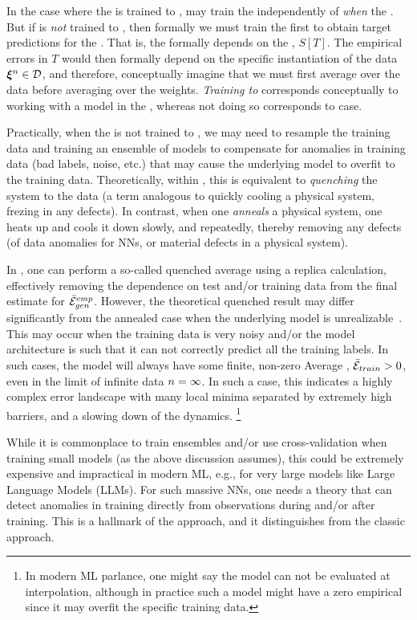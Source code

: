 In the case where the \Teacher is trained to \Interpolation, may train the \Student 
independently of \emph{when} the \Teacher.  
But if \Teacher is \emph{not} trained to \Interpolation, then formally we must train the \Teacher
first to obtain target predictions for the \Student.  That is, the \Student formally
depends on the \Teacher, $S[T]$.
The empirical errors in $T$ would then formally depend on the specific instantiation of the data  $\boldsymbol{\xi}^{n}\in\mathcal{D}$,
and therefore, conceptually imagine that we must first average over the data
before averaging over the weights.
\emph{Training to \Interpolation} corresponds conceptually to working with a model
in the \AnnealedApproximation, whereas not doing so corresponds to \Quenched case.

Practically, when the \Teacher is not trained to \Interpolation, 
we may need to resample the training data and training an ensemble of models to compensate for anomalies in training data (bad labels, noise, etc.) that may cause the underlying model to overfit to the training data.
Theoretically, within \SMOG, this is equivalent to \emph{quenching} the system to the data (a term analogous to quickly cooling a physical system, frezing in any defects).
In contrast, when one \emph{anneals} a physical system, one heats up and cools it down slowly, and repeatedly, thereby removing any defects (of data anomalies for NNs, or material defects in a physical system).

In \STATMECH, one can perform a so-called quenched average using a replica calculation,
effectively removing the dependence on test and/or training data
from the final estimate for $\bar{\mathcal{E}}^{emp}_{gen}$.
However, the theoretical quenched result may differ significantly from the annealed case when the underlying model is unrealizable~\cite{SST92}. 
This may occur when the training data is very noisy and/or the model architecture is such that it can not correctly predict all the training labels.
In such cases, the model will always have some finite, non-zero Average \TrainingError, $\bar{\mathcal{E}}_{train} > 0$,
even in the \LargeN limit of infinite data $n=\infty$. In such a case, this indicates
a highly complex error landscape with many local minima separated by extremely high barriers,
and a slowing down of the dynamics.%
\footnote{In modern ML parlance, one might say the model can not be evaluated at interpolation, although 
in practice such a model might have a zero empirical \TrainingError since it may overfit the specific training data.}

While it is commonplace to train ensembles and/or use cross-validation when training small models (as the above discussion assumes),
this could be extremely expensive and impractical in modern ML, e.g., for very large models like Large Language Models (LLMs).
For such massive NNs, one needs a theory that can detect anomalies in training directly from observations during and/or after training.
This is a hallmark of the \SETOL approach, and it distinguishes \SETOL from the classic \STATMECH approach.




